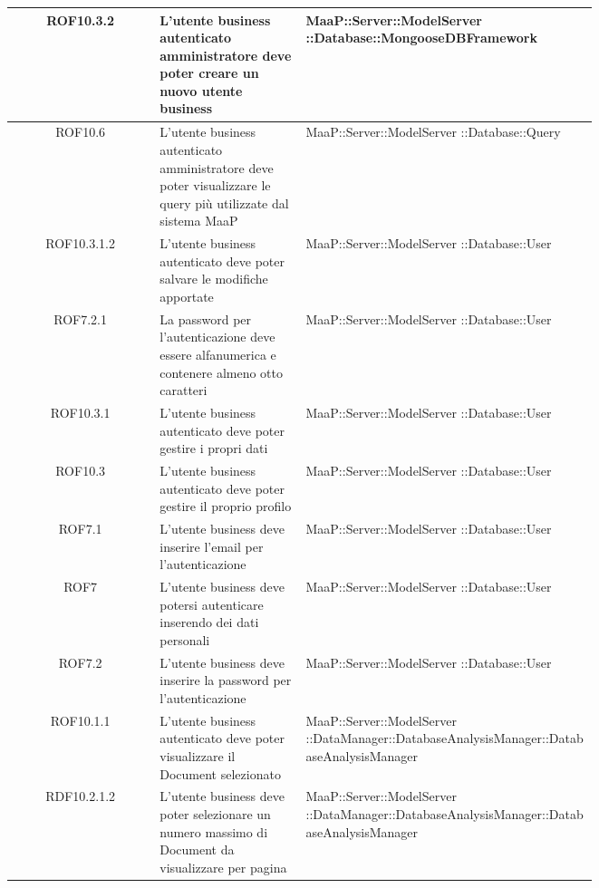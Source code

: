 \begin{center}
\begin{longtable}{|c|p{0.25\linewidth}|p{0.5\linewidth}|}
\midrule
ROF10.3.2
& L'utente business autenticato amministratore deve poter creare un nuovo utente business
& MaaP::Server::ModelServer ::Database::MongooseDBFramework\\

\midrule
ROF10.6
& L'utente business autenticato amministratore deve poter visualizzare le query più utilizzate dal sistema MaaP
& MaaP::Server::ModelServer ::Database::Query\\

\midrule
ROF10.3.1.2
& L'utente business autenticato deve poter  salvare le modifiche apportate
& MaaP::Server::ModelServer ::Database::User\\

\midrule
ROF7.2.1
& La password per l'autenticazione deve essere alfanumerica e contenere almeno otto caratteri
& MaaP::Server::ModelServer ::Database::User\\

\midrule
ROF10.3.1
& L'utente business autenticato deve poter gestire i propri dati
& MaaP::Server::ModelServer ::Database::User\\

\midrule
ROF10.3
& L'utente business autenticato deve poter gestire il proprio profilo
& MaaP::Server::ModelServer ::Database::User\\

\midrule
ROF7.1
& L'utente business deve inserire l'email per l'autenticazione
& MaaP::Server::ModelServer ::Database::User\\

\midrule
ROF7
& L'utente business deve potersi autenticare inserendo dei dati personali
& MaaP::Server::ModelServer ::Database::User\\

\midrule
ROF7.2
& L'utente business deve inserire la password per l'autenticazione
& MaaP::Server::ModelServer ::Database::User\\

\midrule
ROF10.1.1
& L'utente business autenticato deve poter visualizzare il Document selezionato
& MaaP::Server::ModelServer ::DataManager::DatabaseAnalysisManager::DatabaseAnalysisManager\\

\midrule
RDF10.2.1.2
& L'utente business deve poter selezionare un numero massimo di Document da visualizzare per pagina
& MaaP::Server::ModelServer ::DataManager::DatabaseAnalysisManager::DatabaseAnalysisManager\\


\end{longtable}
\end{center}

